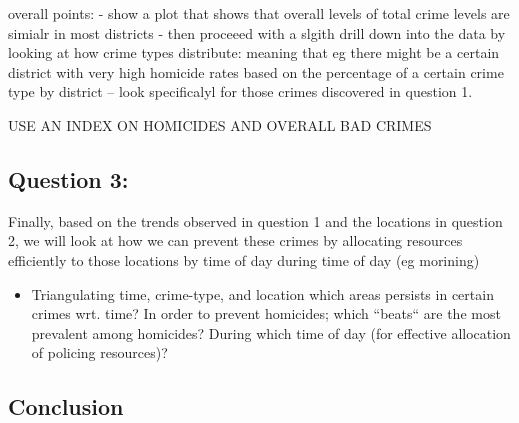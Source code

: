 \documentclass[a4paper]{article}
\begin{document}
overall points:
- show a plot that shows that overall levels of total crime levels are simialr in most districts 
- then proceeed with a slgith drill down into the data by looking at how crime types distribute: meaning that eg there might be a certain district with very high homicide rates based on the percentage of a certain crime type by district -- look specificalyl for those crimes discovered in question 1. 


USE AN INDEX ON HOMICIDES AND OVERALL BAD CRIMES 



\subsection{Question 3:}


Finally, based on the trends observed in question 1 and the locations in question 2, we will look at how we can prevent these crimes by allocating resources efficiently to those locations by time of day during time of day (eg morining)


\begin{itemize}
  \item Triangulating time, crime-type, and location which areas persists in certain crimes wrt. time?
In order to prevent homicides; which “beats“ are the most prevalent among homicides? During which time of day (for effective allocation of policing resources)? 
\end{itemize}








\subsection{Conclusion}
\end{document}

